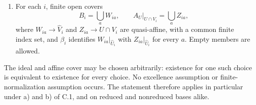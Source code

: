 \begin{theorem}
\begin{enumerate}
\item For each $i$, finite open covers
\[
 B_i=\bigcup_a W_{ia},\qquad
 A_U|_{U\cap V_i}=\bigcup_a Z_{ia},
                                                        \tag{C-RD13.3}
\]
where $W_{ia}\to\widehat V_i$ and $Z_{ia}\to U\cap V_i$ are
quasi-affine, with a common finite index set, and $\beta_i$ identifies
$W_{ia}|_{\widehat U_i}$ with $Z_{ia}|_{\widehat U_i}$ for every $a$.
Empty members are allowed.
\end{enumerate}
The ideal and affine cover may be chosen arbitrarily: existence for
one such choice is equivalent to existence for every choice. No
excellence assumption or finite-normalization assumption occurs.
The statement therefore applies in particular under a) and b) of C.1,
and on reduced and nonreduced bases alike.
\end{theorem}
